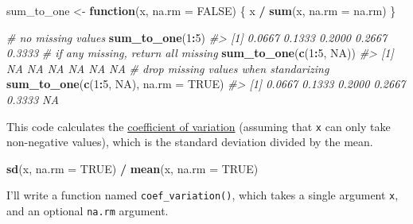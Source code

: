 \documentclass[]{book}
\newenvironment{Shaded}{\begin{snugshade}}{\end{snugshade}}
\newcommand{\CommentTok}[1]{\textcolor[rgb]{0.56,0.35,0.01}{\textit{#1}}}
\newcommand{\ControlFlowTok}[1]{\textcolor[rgb]{0.13,0.29,0.53}{\textbf{#1}}}
\newcommand{\DataTypeTok}[1]{\textcolor[rgb]{0.13,0.29,0.53}{#1}}
\newcommand{\DecValTok}[1]{\textcolor[rgb]{0.00,0.00,0.81}{#1}}
\newcommand{\KeywordTok}[1]{\textcolor[rgb]{0.13,0.29,0.53}{\textbf{#1}}}
\newcommand{\NormalTok}[1]{#1}
\newcommand{\OperatorTok}[1]{\textcolor[rgb]{0.81,0.36,0.00}{\textbf{#1}}}
\newcommand{\OtherTok}[1]{\textcolor[rgb]{0.56,0.35,0.01}{#1}}
\newcommand{\StringTok}[1]{\textcolor[rgb]{0.31,0.60,0.02}{#1}}
\theoremstyle{plain}
\theoremstyle{remark}
\begin{document}
\begin{Shaded}
\begin{Highlighting}[]
\NormalTok{sum_to_one <-}\StringTok{ }\ControlFlowTok{function}\NormalTok{(x, }\DataTypeTok{na.rm =} \OtherTok{FALSE}\NormalTok{) \{}
\NormalTok{  x }\OperatorTok{/}\StringTok{ }\KeywordTok{sum}\NormalTok{(x, }\DataTypeTok{na.rm =}\NormalTok{ na.rm)}
\NormalTok{\}}
\end{Highlighting}
\end{Shaded}

\begin{Shaded}
\begin{Highlighting}[]
\CommentTok{# no missing values}
\KeywordTok{sum_to_one}\NormalTok{(}\DecValTok{1}\OperatorTok{:}\DecValTok{5}\NormalTok{)}
\CommentTok{#> [1] 0.0667 0.1333 0.2000 0.2667 0.3333}
\CommentTok{# if any missing, return all missing}
\KeywordTok{sum_to_one}\NormalTok{(}\KeywordTok{c}\NormalTok{(}\DecValTok{1}\OperatorTok{:}\DecValTok{5}\NormalTok{, }\OtherTok{NA}\NormalTok{))}
\CommentTok{#> [1] NA NA NA NA NA NA}
\CommentTok{# drop missing values when standarizing}
\KeywordTok{sum_to_one}\NormalTok{(}\KeywordTok{c}\NormalTok{(}\DecValTok{1}\OperatorTok{:}\DecValTok{5}\NormalTok{, }\OtherTok{NA}\NormalTok{), }\DataTypeTok{na.rm =} \OtherTok{TRUE}\NormalTok{)}
\CommentTok{#> [1] 0.0667 0.1333 0.2000 0.2667 0.3333     NA}
\end{Highlighting}
\end{Shaded}

This code calculates the
\href{https://en.wikipedia.org/wiki/Coefficient_of_variation}{coefficient
of variation} (assuming that \texttt{x} can only take non-negative
values), which is the standard deviation divided by the mean.

\begin{Shaded}
\begin{Highlighting}[]
\KeywordTok{sd}\NormalTok{(x, }\DataTypeTok{na.rm =} \OtherTok{TRUE}\NormalTok{) }\OperatorTok{/}\StringTok{ }\KeywordTok{mean}\NormalTok{(x, }\DataTypeTok{na.rm =} \OtherTok{TRUE}\NormalTok{)}
\end{Highlighting}
\end{Shaded}

I'll write a function named \texttt{coef\_variation()}, which takes a
single argument \texttt{x}, and an optional \texttt{na.rm} argument.
\end{document}
